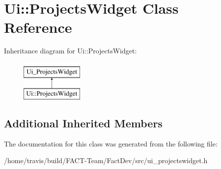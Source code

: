 \hypertarget{classUi_1_1ProjectsWidget}{\section{Ui\-:\-:Projects\-Widget Class Reference}
\label{classUi_1_1ProjectsWidget}
}
Inheritance diagram for Ui\-:\-:Projects\-Widget\-:\begin{figure}[H]
\begin{center}
\leavevmode
\includegraphics[height=2.000000cm]{db/ddd/classUi_1_1ProjectsWidget}
\end{center}
\end{figure}
\subsection*{Additional Inherited Members}


The documentation for this class was generated from the following file\-:\begin{DoxyCompactItemize}
\item 
/home/travis/build/\-F\-A\-C\-T-\/\-Team/\-Fact\-Dev/src/ui\-\_\-projectswidget.\-h\end{DoxyCompactItemize}
